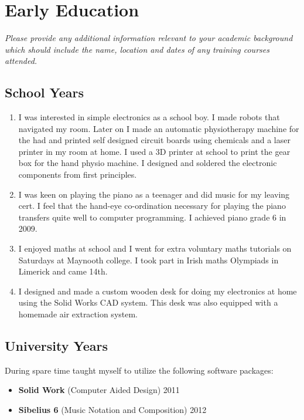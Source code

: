 \documentclass[paper=a4, fontsize=11pt]{scrartcl} %
\numberwithin{equation}{section} %
\numberwithin{figure}{section} %
\numberwithin{table}{section} %
\begin{document}
\section{Early Education}
\textit{Please provide any additional information relevant to your academic background which should include the name, location and dates of any training courses attended.}

\subsection{School Years}

\begin{enumerate}
  \item I was interested in simple electronics as a school boy. I made robots that navigated my room. Later on I made an automatic physiotherapy machine for the had and printed self designed circuit boards using chemicals and a laser printer in my room at home. I used a 3D printer at school to print the gear box for the hand physio machine. I designed and soldered the electronic components from first principles.

  \item I was keen on playing the piano as a teenager and did music for my leaving cert. I feel that the hand-eye co-ordination necessary for playing the piano transfers quite well to computer programming. I achieved piano grade 6 in 2009.
    
  \item I enjoyed maths at school and I went for extra voluntary maths tutorials on Saturdays at Maynooth college. I took part in Irish maths Olympiads in Limerick and came 14th.
    
  \item I designed and made a custom wooden desk for doing my electronics at home using the Solid Works CAD system. This desk was also equipped with a homemade air extraction system.
  
\end{enumerate}





\subsection{University Years}
 During spare time taught myself to utilize the following software packages:
\begin{itemize}
\item \textbf{Solid Work}  (Computer Aided Design) 2011
\item \textbf{Sibelius 6} (Music Notation and Composition) 2012
\end{itemize}
\end{document}
